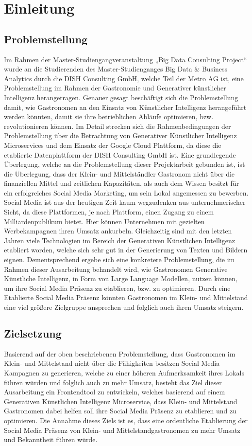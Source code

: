 \section{Einleitung}
\subsection{Problemstellung}
Im Rahmen der Master-Studiengangveranstaltung „Big Data Consulting Project“ wurde an die Studierenden des Master-Studienganges Big Data \& Business Analytics durch die DISH Consulting GmbH, welche Teil der Metro AG ist, eine Problemstellung im Rahmen der Gastronomie und Generativer künstlicher Intelligenz herangetragen.
Genauer gesagt beschäftigt sich die Problemstellung damit, wie Gastronomen an den Einsatz von Künstlicher Intelligenz herangeführt werden könnten, damit sie ihre betrieblichen Abläufe optimieren, bzw. revolutionieren können.
Im Detail strecken sich die Rahmenbedingungen der Problemstellung über die Betrachtung von Generativer Künstlicher Intelligenz Microservices und dem Einsatz der Google Cloud Plattform, da diese die etablierte Datenplattform der DISH Consulting GmbH ist.
Eine grundlegende Überlegung, welche an die Problemstellung dieser Projektarbeit gebunden ist, ist die Überlegung, dass der Klein- und Mittelständler Gastronom nicht über die finanziellen Mittel und zeitlichen Kapazitäten, als auch dem Wissen besitzt für ein erfolgreiches Social Media Marketing, um sein Lokal angemessen zu bewerben.
Social Media ist aus der heutigen Zeit kaum wegzudenken aus unternehmerischer Sicht, da diese Plattformen, je nach Plattform, einen Zugang zu einem Milliardenpublikum bietet.
Hier können Unternehmen mit gezielten Werbekampagnen ihren Umsatz ankurbeln.
Gleichzeitig sind mit den letzten Jahren viele Technologien im Bereich der Generativen Künstlichen Intelligenz etabliert worden, welche sich sehr gut in der Generierung von Texten und Bildern eignen.
Dementsprechend ergebe sich eine konkretere Problemstellung, die im Rahmen dieser Ausarbeitung behandelt wird, wie Gastronomen Generative Künstliche Intelligenz, in Form von Large Language Modellen, nutzen können, um ihre Social Media Präsenz zu etablieren, bzw. zu optimieren.
Durch eine Etablierte Social Media Präsenz könnten Gastronomen im Klein- und Mittelstand eine viel größere Zielgruppe ansprechen und folglich auch ihren Umsatz steigern.

\subsection{Zielsetzung}
Basierend auf der oben beschriebenen Problemstellung, dass Gastronomen im Klein- und Mittelstand nicht über die Fähigkeiten besitzen Social Media Kampagnen zu generieren, welche zu einer höheren Aufmerksamkeit ihres Lokals führen würden und folglich auch zu mehr Umsatz, besteht das Ziel dieser Ausarbeitung ein Frontendtool zu entwickeln, welches basierend auf einem Generativen Künstlichen Intelligenz Microservice, dass Klein- und Mittelstand Gastronomen dabei helfen soll ihre Social Media Präsenz zu etablieren und zu optimieren.
Die Annahme dieses Ziels ist es, dass eine ordentliche Etablierung der Social Media Präsenz von Klein- und Mittelstandgastronomen zu mehr Umsatz und Bekanntheit führen würde.

